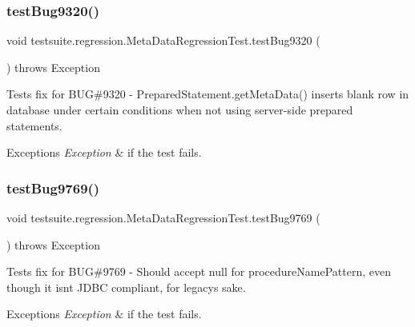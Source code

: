\subsubsection{\texorpdfstring{test\+Bug9320()}{testBug9320()}}
{\footnotesize\ttfamily void testsuite.\+regression.\+Meta\+Data\+Regression\+Test.\+test\+Bug9320 (\begin{DoxyParamCaption}{ }\end{DoxyParamCaption}) throws Exception}

Tests fix for B\+UG\#9320 -\/ Prepared\+Statement.\+get\+Meta\+Data() inserts blank row in database under certain conditions when not using server-\/side prepared statements.


\begin{DoxyExceptions}{Exceptions}
{\em Exception} & if the test fails. \\
\hline
\end{DoxyExceptions}
\mbox{\label{classtestsuite_1_1regression_1_1_meta_data_regression_test_aaeda7a5f9b968ba3bb866fb2fb62b75c}} 
\subsubsection{\texorpdfstring{test\+Bug9769()}{testBug9769()}}
{\footnotesize\ttfamily void testsuite.\+regression.\+Meta\+Data\+Regression\+Test.\+test\+Bug9769 (\begin{DoxyParamCaption}{ }\end{DoxyParamCaption}) throws Exception}

Tests fix for B\+UG\#9769 -\/ Should accept null for procedure\+Name\+Pattern, even though it isn\textquotesingle{}t J\+D\+BC compliant, for legacy\textquotesingle{}s sake.


\begin{DoxyExceptions}{Exceptions}
{\em Exception} & if the test fails. \\
\hline
\end{DoxyExceptions}
\mbox{\label{classtestsuite_1_1regression_1_1_meta_data_regression_test_a0cb82d7f4b575ebc9da191ff69ab222c}} 
